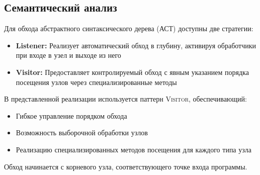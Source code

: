 \subsection{Семантический анализ}
Для обхода абстрактного синтаксического дерева (АСТ) доступны две стратегии:
\begin{itemize}
    \item \textbf{Listener:} Реализует автоматический обход в глубину, активируя обработчики при входе в узел и выходе из него
    \item \textbf{Visitor:} Предоставляет контролируемый обход с явным указанием порядка посещения узлов через специализированные методы
\end{itemize}

В представленной реализации используется паттерн \textsc{Visitor}, обеспечивающий:
\begin{itemize}
    \item Гибкое управление порядком обхода
    \item Возможность выборочной обработки узлов
    \item Реализацию специализированных методов посещения для каждого типа узла
\end{itemize}
Обход начинается с корневого узла, соответствующего точке входа программы.

\newpage